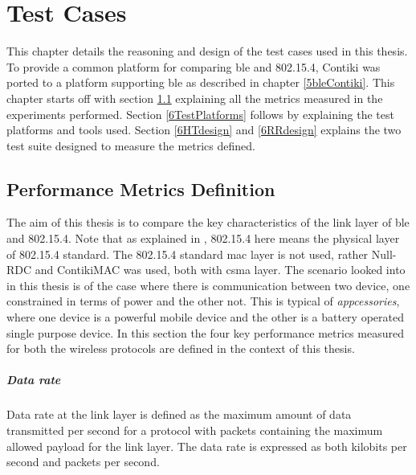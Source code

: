 \chapter{Test Cases} \label{6Testing}

This chapter details the reasoning and design of the test cases used in this thesis. To provide a common platform for comparing \gls{ble} and 802.15.4, Contiki was ported to a platform supporting \gls{ble} as described in chapter \ref{5bleContiki}. This chapter starts off with section \ref{6Metrics} explaining all the metrics measured in the experiments performed. Section \ref{6TestPlatforms} follows by explaining the test platforms and tools used. Section \ref{6HTdesign} and \ref{6RRdesign} explains the two test suite designed to measure the metrics defined.


\section{Performance Metrics Definition} \label{6Metrics}
The aim of this thesis is to compare the key characteristics of the link layer of \gls{ble}  and 802.15.4. Note that as explained in , 802.15.4 here means the physical layer of 802.15.4 standard. The 802.15.4 standard \gls{mac} layer is not used, rather Null-RDC and ContikiMAC was used, both with \gls{csma} layer. The scenario looked into in this thesis is of the case where there is communication between two device, one constrained in terms of power and the other not. This is typical of \emph{appcessories}, where one device is a powerful mobile device and the other is a battery operated single purpose device.
In this section the four key performance metrics measured for both the wireless protocols are defined in the context of this thesis.

\paragraph{Data rate}
Data rate at the link layer is defined as the maximum amount of data transmitted per second for a protocol with packets containing the maximum allowed payload for the link layer. The data rate is expressed as both kilobits per second and packets per second.

